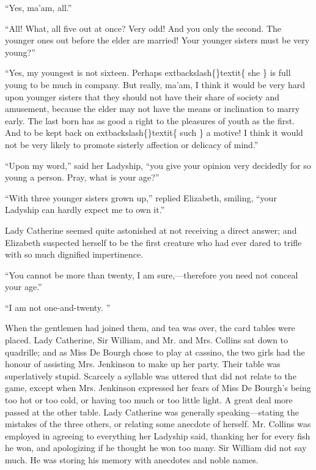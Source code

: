 \documentclass[10pt]{book}
\begin{document}
   “Yes, ma’am, all.”
  

   “All! What, all five out at once? Very odd! And you only the second. The
younger ones out before the elder are married! Your younger sisters must
be very young?”
  

   “Yes, my youngest is not sixteen. Perhaps
   	extbackslash\{\}textit\{
    she
   \}
   is full young to be much
in company. But really, ma’am, I think it would be very hard upon
younger sisters that they should not have their share of society and
amusement, because the elder may not have the means or inclination to
marry early. The last born has as good a right to the pleasures of youth
as the first. And to be kept back on
   	extbackslash\{\}textit\{
    such
   \}
   a motive! I think it would
not be very likely to promote sisterly affection or delicacy of mind.”
  

   “Upon my word,” said her Ladyship, “you give your opinion very decidedly
for so young a person. Pray, what is your age?”
  

   “With three younger sisters grown up,” replied Elizabeth, smiling, “your
Ladyship can hardly expect me to own it.”
  

   Lady Catherine seemed quite astonished at not receiving a direct answer;
and Elizabeth suspected herself to be the first creature who had ever
dared to trifle with so much dignified impertinence.
  

   “You cannot be more than twenty, I am sure,—therefore you need not
conceal your age.”
  

   “I am not one-and-twenty.
   ”
  

   When the gentlemen had joined them, and tea was over, the card tables
were placed. Lady Catherine, Sir William, and Mr. and Mrs. Collins sat
down to quadrille; and as Miss De Bourgh chose to play at cassino, the
two girls had the honour of assisting Mrs. Jenkinson to make up her
party. Their table was superlatively stupid. Scarcely a syllable was
uttered that did not relate to the game, except when Mrs. Jenkinson
expressed her fears of Miss De Bourgh’s being too hot or too cold, or
having too much or too little light. A great deal more passed at the
other table. Lady Catherine was generally speaking—stating the mistakes
of the three others, or relating some anecdote of herself. Mr. Collins
was employed in agreeing to everything her Ladyship said, thanking her
for every fish he won, and apologizing if he thought he won too many.
Sir William did not say much. He was storing his memory with anecdotes
and noble names.
  
\end{document}
